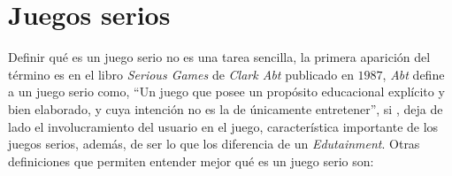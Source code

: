 \chapter{Juegos serios}
\label{chap:juegos_serios}




Definir qué es un juego serio no es una tarea sencilla, la primera aparición del
término es en el libro \emph{Serious Games} de \emph{Clark Abt} publicado en
$1987$\cite{abt1987serious}, \emph{Abt} define a un juego serio como,
\enquote{Un juego que posee un propósito educacional explícito y bien elaborado,
    y cuya intención no es la de únicamente entretener}\cite{abt1987serious}, si
, deja de
lado el involucramiento del usuario en el juego, característica importante de
los juegos serios, además, de ser lo que los diferencia de un
\emph{Edutainment}\cite{resnick:2004,charsky:2010}. Otras definiciones que
permiten entender mejor qué es un juego serio son:

